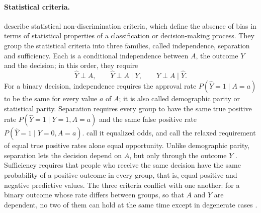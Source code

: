 \paragraph{Statistical criteria.}
\citet[Ch.~3]{barocas2023fairness} describe statistical non-dis\-crim\-i\-na\-tion criteria, which define
the absence of bias in terms of statistical properties of a classification or decision-making process.
They group the statistical criteria into three families, called
independence, separation and sufficiency. Each is a conditional independence between $A$, the
outcome $Y$ and the decision; in this order, they require
\begin{equation}
  \hat{Y} \perp A, \qquad
  \hat{Y} \perp A \mid Y, \qquad
  Y \perp A \mid \hat{Y}.
  \label{eq:bg-group-criteria}
\end{equation}
For a binary decision, independence requires the approval rate $P(\hat{Y} = 1 \mid A = a)$ to be
the same for every value $a$ of $A$; it is also called demographic parity or statistical parity.
Separation requires every group to have the same true positive rate
$P(\hat{Y} = 1 \mid Y = 1, A = a)$ and the same false positive rate
$P(\hat{Y} = 1 \mid Y = 0, A = a)$. \citet{hardt2016equality} call it equalized odds, and call the
relaxed requirement of equal true positive rates alone equal opportunity. Unlike demographic parity,
separation lets the decision depend on $A$, but only through the outcome $Y$
\cite{hardt2016equality}. Sufficiency requires that people who receive the same decision have the
same probability of a positive outcome in every group, that is, equal positive and negative
predictive values. The three criteria conflict with one another: for a binary outcome whose rate
differs between groups, so that $A$ and $Y$ are dependent, no two of them can hold at the same time
except in degenerate cases \citep[Ch.~3]{barocas2023fairness}.

